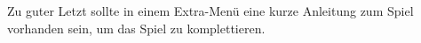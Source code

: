Zu guter Letzt sollte in einem Extra-Menü eine kurze Anleitung zum Spiel vorhanden sein, um das Spiel zu komplettieren.